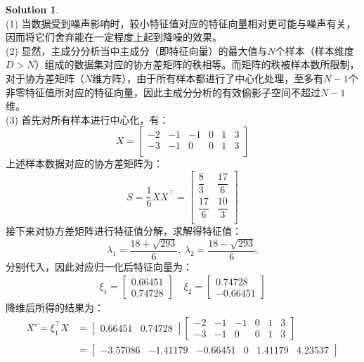 \documentclass[a4paper,UTF8]{article}
\theoremstyle{definition}
\newtheorem*{solution}{Solution}
\begin{document}
\begin{solution}
~\\(1) 当数据受到噪声影响时，较小特征值对应的特征向量相对更可能与噪声有关，因而将它们舍弃能在一定程度上起到降噪的效果。
 \\(2) 显然，主成分分析当中主成分（即特征向量）的最大值与$N$个样本（样本维度$D>N$）组成的数据集对应的协方差矩阵的秩相等。而矩阵的秩被样本数所限制，对于协方差矩阵（$N$维方阵），由于所有样本都进行了中心化处理，至多有$N-1$个非零特征值所对应的特征向量，因此主成分分析的有效偷影子空间不超过$N-1$维。
 \\(3) 首先对所有样本进行中心化，有：
 \begin{equation}\nonumber
	X=
 \left[
 \begin{array}{cccccc}
     -2 &-1 &-1 &0 &1 &3 \\
     -3 &-1 &0  &0 &1 &3 \\
 \end{array}
 \right]        
 \end{equation}
上述样本数据对应的协方差矩阵为：
\begin{equation}\nonumber
	S = \frac{1}{6}XX^{\top}=
 \left[
 \begin{array}{cc}
     \dfrac{8}{3}	&\dfrac{17}{6}\\[9pt]
     \dfrac{17}{6}	&\dfrac{10}{3}\\
 \end{array}
 \right]        
\end{equation}
接下来对协方差矩阵进行特征值分解，求解得特征值：$$\lambda_1 = \frac{18+\sqrt{293}}{6},\ \lambda_2 = \frac{18-\sqrt{293}}{6}.$$分别代入，因此对应归一化后特征向量为：
\begin{gather*}
\xi_1 = \begin{bmatrix} 0.66451 \\ 0.74728 \end{bmatrix}\quad
\xi_2 = \begin{bmatrix} 0.74728 \\ -0.66451 \end{bmatrix}
\end{gather*}
降维后所得的结果为：
\begin{equation}\nonumber
\begin{aligned}
	X' = \xi_1^{\top} X &= 
 \left[
 \begin{array}{cc}
 0.66451 & 0.74728
 \end{array} 
 \right]	
 \left[
 \begin{array}{cccccc}
     -2 &-1 &-1 &0 &1 &3 \\
     -3 &-1 &0  &0 &1 &3
 \end{array}
 \right]\\&=        
 \left[
 \begin{array}{cccccc}
     -3.57086 &-1.41179 &-0.66451 &0 &1.41179 &4.23537
 \end{array}\right]
\end{aligned}
\end{equation}
\end{solution}
\end{document}
